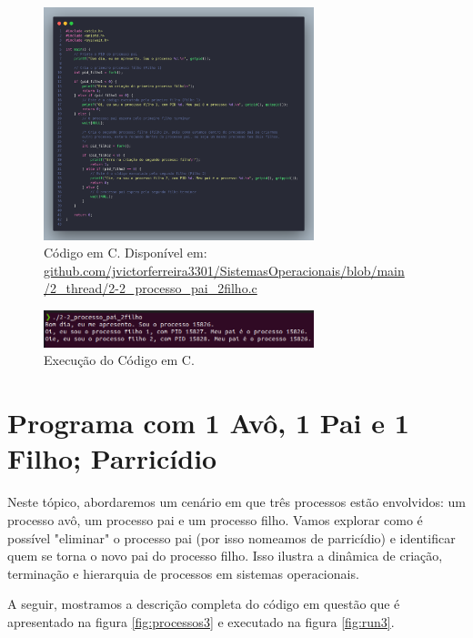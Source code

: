 \documentclass[
	12pt,				%
	openright,			%
	oneside,			%
	a4paper,			%
	chapter=TITLE,		%
	english,			%
	french,				%
	spanish,			%
	brazil				%
	]{abntex2}
\theoremstyle{definition}
\begin{document}
\begin{figure}
    \centering
    \includegraphics[width=0.7\textwidth]{imagens/processos_2.png}
    \caption{Código em C. Disponível em: \href{https://github.com/jvictorferreira3301/Sistemas_Operacionais/blob/main/2_thread/2-2_processo_pai_2filho.c}{github.com/jvictorferreira3301/SistemasOperacionais/blob/main
    /2\_thread/2-2\_processo\_pai\_2filho.c}}
    \label{fig:processos2}
\end{figure}

\begin{figure}
    \centering
    \includegraphics[width=0.7\textwidth]{imagens/run_processos_2.png}
    \caption{Execução do Código em C.}
    \label{fig:run2}
\end{figure}

\section{Programa com 1 Avô, 1 Pai e 1 Filho; Parricídio}

Neste tópico, abordaremos um cenário em que três processos estão 
envolvidos: um processo avô, um processo pai e um processo filho.
Vamos explorar como é possível "eliminar" o processo pai (por isso nomeamos de parricídio)
e identificar quem se torna o novo pai do processo filho. Isso ilustra a dinâmica de 
criação, terminação e hierarquia de processos em sistemas operacionais.

A seguir, mostramos a descrição completa do código em questão que é
apresentado na figura \ref{fig:processos3} e executado na figura \ref{fig:run3}.
\end{document}
